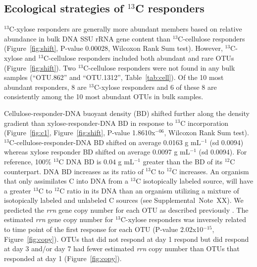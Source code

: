 \subsection{Ecological strategies of $^{13}$C responders}
$^{13}$C-xylose responders are generally more abundant members based on
relative abundance in bulk DNA SSU rRNA gene content than $^{13}$C-cellulose
responders (Figure~\ref{fig:shift}, P-value 0.00028, Wilcoxon Rank Sum test).
However, $^{13}$C-xylose and $^{13}$C-cellulose responders included both
abundant and rare OTUs (Figure~\ref{fig:shift}). Two
$^{13}$C-cellulose responders were not found in any bulk samples (``OTU.862''
and ``OTU.1312'', Table~\ref{tab:cell}). Of the
10 most abundant responders,
8 are $^{13}$C-xylose responders and 6 of these 8 are consistently among the 10
  most abundant OTUs in bulk samples.

Cellulose-responder-DNA buoyant density (BD) shifted further along the density
gradient than xylose-responder-DNA BD in response to $^{13}$C incorporation
(Figure~\ref{fig:c1}, Figure~\ref{fig:shift}, P-value 1.8610x$^{-06}$, Wilcoxon
Rank Sum test). $^{13}$C-cellulose-responder-DNA BD shifted on average
0.0163 g mL$^{-1}$ (sd 0.0094) whereas xylose responder BD shifted on average
0.0097 g mL$^{-1}$ (sd 0.0094). For reference, 100\% $^{13}$C DNA BD is 0.04
g mL$^{-1}$ greater than the BD of its $^{12}$C counterpart. DNA BD increases
as its ratio of $^{13}$C to $^{12}$C increases. An organism that only
assimilates C into DNA from a $^{13}$C isotopically labeled source, will have
a greater $^{13}$C to $^{12}$C ratio in its DNA than an organism utilizing
a mixture of isotopically labeled and unlabeled C sources (see
Supplemental~Note~XX). We predicted the \textit{rrn} gene copy number for each
OTU as described previously \citep{Kembel_2012}. The estimated
\textit{rrn} gene copy number for $^{13}$C-xylose responders was inversely
related to time point of the first response for each OTU (P-value
2.02x10$^{-15}$, Figure~\ref{fig:copy}). OTUs that did not respond at day
1 respond but did respond at day 3 and/or day 7 had fewer estimated
\textit{rrn} copy number than OTUs that responded at day 1
(Figure~\ref{fig:copy}). 

